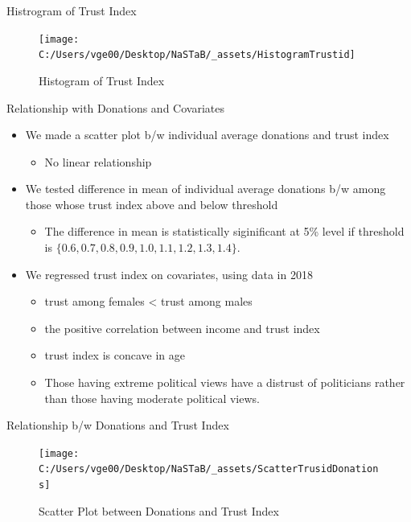 \documentclass[
  ignorenonframetext,
]{beamer}
\providecommand{\tightlist}{%
  \setlength{\itemsep}{0pt}\setlength{\parskip}{0pt}}
\begin{document}
\begin{frame}{Histrogram of Trust Index}
\protect\hypertarget{histrogram-of-trust-index}{}
\begin{figure}
\texttt{[image: C:/Users/vge00/Desktop/NaSTaB/\_assets/HistogramTrustid]} \caption{Histogram of Trust Index}\label{fig:unnamed-chunk-3}
\end{figure}
\end{frame}

\begin{frame}{Relationship with Donations and Covariates}
\protect\hypertarget{relationship-with-donations-and-covariates}{}
\begin{itemize}
\tightlist
\item
  We made a scatter plot b/w individual average donations and trust
  index

  \begin{itemize}
  \tightlist
  \item
    No linear relationship
  \end{itemize}
\item
  We tested difference in mean of individual average donations b/w among
  those whose trust index above and below threshold

  \begin{itemize}
  \tightlist
  \item
    The difference in mean is statistically siginificant at 5\% level if
    threshold is \(\{0.6, 0.7, 0.8, 0.9, 1.0, 1.1, 1.2, 1.3, 1.4\}\).
  \end{itemize}
\item
  We regressed trust index on covariates, using data in 2018

  \begin{itemize}
  \tightlist
  \item
    trust among females \textless{} trust among males
  \item
    the positive correlation between income and trust index
  \item
    trust index is concave in age
  \item
    Those having extreme political views have a distrust of politicians
    rather than those having moderate political views.
  \end{itemize}
\end{itemize}
\end{frame}

\begin{frame}{Relationship b/w Donations and Trust Index}
\protect\hypertarget{relationship-bw-donations-and-trust-index}{}
\begin{figure}
\texttt{[image: C:/Users/vge00/Desktop/NaSTaB/\_assets/ScatterTrusidDonations]} \caption{Scatter Plot between Donations and Trust Index}\label{fig:unnamed-chunk-4}
\end{figure}
\end{frame}
\end{document}
